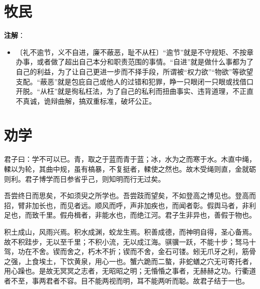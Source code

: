\documentclass[12pt,UTF-8,openany]{ctexbook}
\begin{document}
\chapter{牧民}

\begin{normalsize}
    
    
\end{normalsize}


\newpage

\textbf{注解}：

\vspace{-1em}

\begin{itemize}
    \setlength\itemsep{-0.2em}
    \item〔礼不逾节，义不自进，廉不蔽恶，耻不从枉〕“逾节”就是不守规矩、不按章办事，或者做了超出自己本分和职责范围的事情。“自进”就是做什么事都为了自己的利益，为了让自己更进一步而不择手段，所谓被“权力欲”“物欲”等欲望支配。“蔽恶”就是包庇自己或他人的过错和犯罪，睁一只眼闭一只眼或找借口开脱。“从枉”就是徇私枉法，为了自己的私利而扭曲事实、违背道理，不正直不真诚，诡辩曲解，搞双重标准，破坏公正。
\end{itemize}

\chapter{劝学}

\begin{normalsize}
    
    君子曰：学不可以已。青，取之于蓝而青于蓝；冰，水为之而寒于水。木直中绳，輮以为轮，其曲中规，虽有槁暴，不复挺者，輮使之然也。故木受绳则直，金就砺则利。君子博学而日参省乎己，则知明而行无过矣。
    
    吾尝终日而思矣，不如须臾之所学也。吾尝跂而望矣，不如登高之博见也。登高而招，臂非加长也，而见者远。顺风而呼，声非加疾也，而闻者彰。假舆马者，非利足也，而致千里。假舟楫者，非能水也，而绝江河。君子生非异也，善假于物也。
    
    积土成山，风雨兴焉。积水成渊，蛟龙生焉。积善成德，而神明自得，圣心备焉。故不积跬步，无以至千里；不积小流，无以成江海。骐骥一跃，不能十步；驽马十驾，功在不舍。锲而舍之，朽木不折；锲而不舍，金石可镂。蚓无爪牙之利，筋骨之强，上食埃土，下饮黄泉，用心一也。蟹六跪而二螯，非蛇蟮之穴无可寄托者，用心躁也。是故无冥冥之志者，无昭昭之明；无惛惛之事者，无赫赫之功。行衢道者不至，事两君者不容。目不能两视而明，耳不能两听而聪。故君子结于一也。
\end{normalsize}
\end{document}
